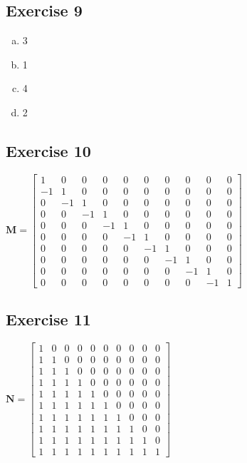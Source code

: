 \documentclass[11pt]{article}
\begin{document}
\subsection{Exercise 9}

\begin{enumerate}[a.]
	\item 3
	\item 1
	\item 4
	\item 2
\end{enumerate}

\subsection{Exercise 10}

$
\textbf{M}=\begin{bmatrix}
	1 & 0 & 0 & 0 & 0 & 0 & 0 & 0 & 0 & 0 \\
	-1 & 1 & 0 & 0 & 0 & 0 & 0 & 0 & 0 & 0 \\
	0 & -1 & 1 & 0 & 0 & 0 & 0 & 0 & 0 & 0 \\
	0 & 0 & -1 & 1 & 0 & 0 & 0 & 0 & 0 & 0 \\
	0 & 0 & 0 & -1 & 1 & 0 & 0 & 0 & 0 & 0 \\
	0 & 0 & 0 & 0 & -1 & 1 & 0 & 0 & 0 & 0 \\
	0 & 0 & 0 & 0 & 0 & -1 & 1 & 0 & 0 & 0 \\
	0 & 0 & 0 & 0 & 0 & 0 & -1 & 1 & 0 & 0 \\
	0 & 0 & 0 & 0 & 0 & 0 & 0 & -1 & 1 & 0\\
	0 & 0 & 0 & 0 & 0 & 0 & 0 & 0 & -1 & 1
\end{bmatrix}
$

\subsection{Exercise 11}

$
\textbf{N}=\begin{bmatrix}
	1 & 0 & 0 & 0 & 0 & 0 & 0 & 0 & 0 & 0 \\
	1 & 1 & 0 & 0 & 0 & 0 & 0 & 0 & 0 & 0 \\
	1 & 1 & 1 & 0 & 0 & 0 & 0 & 0 & 0 & 0 \\
	1 & 1 & 1 & 1 & 0 & 0 & 0 & 0 & 0 & 0 \\
	1 & 1 & 1 & 1 & 1 & 0 & 0 & 0 & 0 & 0 \\
	1 & 1 & 1 & 1 & 1 & 1 & 0 & 0 & 0 & 0 \\
	1 & 1 & 1 & 1 & 1 & 1 & 1 & 0 & 0 & 0 \\
	1 & 1 & 1 & 1 & 1 & 1 & 1 & 1 & 0 & 0 \\
	1 & 1 & 1 & 1 & 1 & 1 & 1 & 1 & 1 & 0\\
	1 & 1 & 1 & 1 & 1 & 1 & 1 & 1 & 1 & 1
\end{bmatrix}
$
\end{document}
